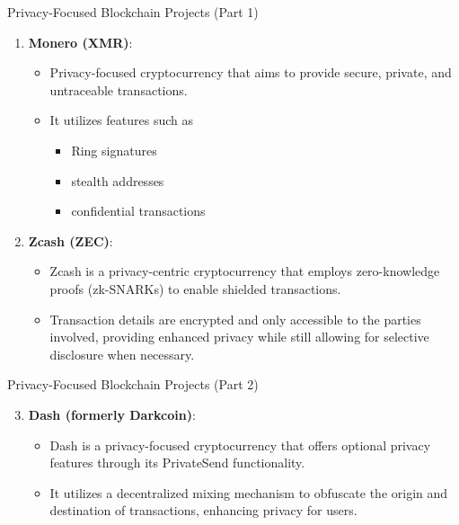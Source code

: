 \begin{withoutheadline}
\begin{frame}{Privacy-Focused Blockchain Projects (Part 1)}
    \begin{enumerate}
        \item \textbf{Monero (XMR)}:
            \begin{itemize}
                \item Privacy-focused cryptocurrency that aims to provide secure, private, and untraceable transactions.
                \item It utilizes features such as
                \begin{itemize}
                    \item Ring signatures
                    \item stealth addresses
                    \item confidential transactions
                \end{itemize}
            \end{itemize}
        
        \item \textbf{Zcash (ZEC)}:
            \begin{itemize}
                \item Zcash is a privacy-centric cryptocurrency that employs zero-knowledge proofs (zk-SNARKs) to enable shielded transactions.
                \item Transaction details are encrypted and only accessible to the parties involved, providing enhanced privacy while still allowing for selective disclosure when necessary.
            \end{itemize}
    \end{enumerate}
\end{frame}

\begin{frame}{Privacy-Focused Blockchain Projects (Part 2)}
    \begin{enumerate}
        \setcounter{enumi}{2}
        \item \textbf{Dash (formerly Darkcoin)}:
            \begin{itemize}
                \item Dash is a privacy-focused cryptocurrency that offers optional privacy features through its PrivateSend functionality.
                \item It utilizes a decentralized mixing mechanism to obfuscate the origin and destination of transactions, enhancing privacy for users.
            \end{itemize}
        

\end{enumerate}
\end{frame}
\end{withoutheadline}
